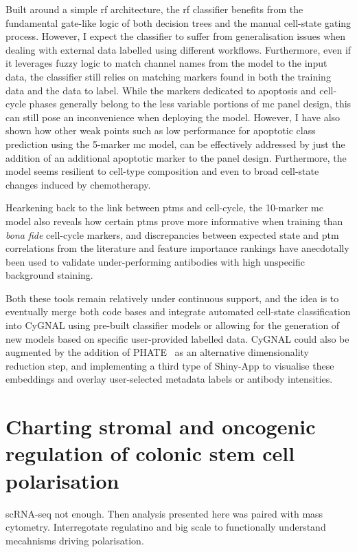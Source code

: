 Built around a simple \acrfull{rf} architecture, the \acrshort{rf} classifier benefits from the fundamental gate-like logic of both decision trees and the manual cell-state gating process. However, I expect the classifier to suffer from generalisation issues when dealing with external data labelled using different workflows. Furthermore, even if it leverages fuzzy logic to match channel names from the model to the input data, the classifier still relies on matching markers found in both the training data and the data to label. While the markers dedicated to apoptosis and cell-cycle phases generally belong to the less variable portions of \acrshort{mc} panel design, this can still pose an inconvenience when deploying the model. However, I have also shown how other weak points such as low performance for apoptotic class prediction using the 5-marker \acrshort{mc} model, can be effectively addressed by just the addition of an additional apoptotic marker to the panel design. Furthermore, the model seems resilient to cell-type composition and even to broad cell-state changes induced by chemotherapy.

Hearkening back to the link between \acrshort{ptm}s and cell-cycle, the 10-marker \acrshort{mc} model also reveals how certain \acrshort{ptm}s prove more informative when training than \emph{bona fide} cell-cycle markers, and discrepancies between expected state and \acrshort{ptm} correlations from the literature and feature importance rankings have anecdotally been used to validate under-performing antibodies with high unspecific background staining.

Both these tools remain relatively under continuous support, and the idea is to eventually merge both code bases and integrate automated cell-state classification into CyGNAL using pre-built classifier models or allowing for the generation of new models based on specific user-provided labelled data.
CyGNAL could also be augmented by the addition of PHATE~\cite{moon_visualizing_2019} as an alternative dimensionality reduction step, and implementing a third type of Shiny-App to visualise these embeddings and overlay user-selected metadata labels or antibody intensities.

\section{Charting stromal and oncogenic regulation of colonic stem cell polarisation}


scRNA-seq not enough.
Then analysis presented here was paired with mass cytometry. Interregotate regulatino and big scale to functionally understand mecahnisms driving polarisation.


